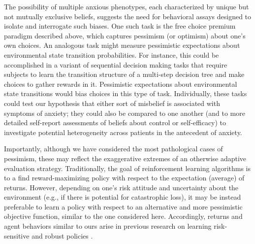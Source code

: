 \documentclass[manuscript]{stjour}
\begin{document}
The possibility of multiple anxious phenotypes, each characterized by unique but not mutually exclusive beliefs, suggests the need for behavioral assays designed to isolate and interrogate such biases. One such task is the free choice premium paradigm described above, which captures pessimism (or optimism) about one's own choices. An analogous task might measure pessimistic expectations about environmental state transition probabilities. For instance, this could be accomplished in a variant of sequential decision making tasks that require subjects to learn the transition structure of a multi-step decision tree \citep{glascher2010, lee2014} and make choices to gather rewards in it. Pessimistic expectations about environmental state transitions would bias choices in this type of task. Individually, these tasks could test our hypothesis that either sort of misbelief is associated with symptoms of anxiety; they could also be compared to one another (and to more detailed self-report assessments of beliefs about control or self-efficacy) to investigate potential heterogeneity across patients in the antecedent of anxiety.

Importantly, although we have considered the most pathological cases of pessimism, these may reflect the exaggerative extremes of an otherwise adaptive evaluation strategy. Traditionally, the goal of reinforcement learning algorithms is to a find reward-maximizing policy with respect to the expectation (average) of returns. However, depending on one's risk attitude and uncertainty about the environment (e.g., if there is potential for catastrophic loss), it may be instead preferable to learn a policy with respect to an alternative and more pessimistic objective function, similar to the one considered here. Accordingly, returns and agent behaviors similar to ours arise in previous research on learning risk-sensitive and robust policies \citep{morimura2012, chow2015, bellemare2017}. 
\end{document}
